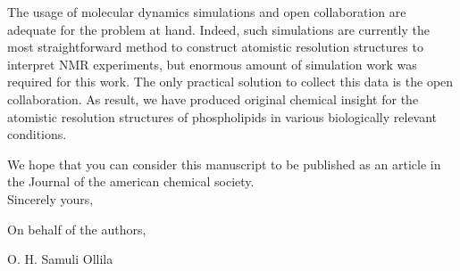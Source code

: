 \documentclass[12pt]{letter}
\begin{document}
The usage of molecular dynamics simulations and open collaboration are adequate for the
problem at hand. Indeed, such simulations are currently the most straightforward method to 
construct atomistic resolution structures to interpret NMR experiments, but
enormous amount of simulation work was required for this work. The only practical
solution to collect this data is the open collaboration.
As result, we have produced original chemical insight for the atomistic resolution 
structures of phospholipids in various biologically relevant conditions.

We hope that you can consider this manuscript to be published as an article in the Journal of the american chemical society. \\




Sincerely yours,

On behalf of the authors,

O. H. Samuli Ollila
\end{document}
